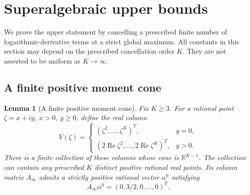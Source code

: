 \documentclass[11pt]{article}
\newtheorem{lemma}[theorem]{Lemma}\newtheorem{lemmaS}{Lemma}[section]
\theoremstyle{remark}\newtheorem{remark}[theorem]{Remark}
\newcommand{\Rea}{\operatorname{Re}}
\begin{document}
\section{Superalgebraic upper bounds}\label{sec:upper}
We prove the upper statement by cancelling a prescribed finite number of
logarithmic-derivative terms at a strict global maximum. All constants in
this section may depend on the prescribed cancellation order \(K\).
They are not asserted to be uniform as \(K\to\infty\).

\subsection{A finite positive moment cone}

\begin{lemma}[A finite positive moment cone]\label{lem:cone}
Fix \(K\ge3\). For a rational point \(\zeta=x+iy\), \(x>0\), \(y\ge0\),
define the real column
\[
 V(\zeta)=
 \begin{cases}
  (\zeta^2,\ldots,\zeta^K)^T,&y=0,\\
  (2\Rea\zeta^2,\ldots,2\Rea\zeta^K)^T,&y>0.
 \end{cases}
\]
There is a finite collection of these columns whose cone is
\(\mathbb R^{K-1}\). The collection can contain any prescribed \(K\)
distinct positive rational real points. Its column matrix \(A_\infty\)
admits a strictly positive rational vector \(\alpha^0\) satisfying
\[
 A_\infty\alpha^0=(0,3/2,0,\ldots,0)^T.
\]
\end{lemma}
\end{document}
